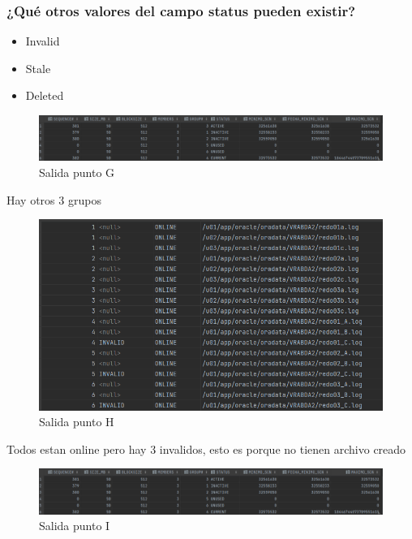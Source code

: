 \documentclass[journal]{IEEEtran}
\begin{document}
\subsubsection{¿Qué otros valores del campo status pueden existir?}
\begin{itemize}
  \item Invalid
  \item Stale
  \item Deleted
\end{itemize}
\begin{figure}[H]
  \centering
  \includegraphics[scale=.20]{captura_5.png}
   \caption{Salida punto G}
   \label{fig:validador_4}
\end{figure}
Hay otros 3 grupos
\begin{figure}[H]
  \centering
  \includegraphics[scale=.20]{captura_4.png}
   \caption{Salida punto H}
   \label{fig:validador_5}
\end{figure}
Todos estan online pero hay 3 invalidos, esto es porque no tienen archivo creado
\begin{figure}[H]
  \centering
  \includegraphics[scale=.20]{captura_5.png}
   \caption{Salida punto I}
   \label{fig:validador_6}
\end{figure}
\end{document}
